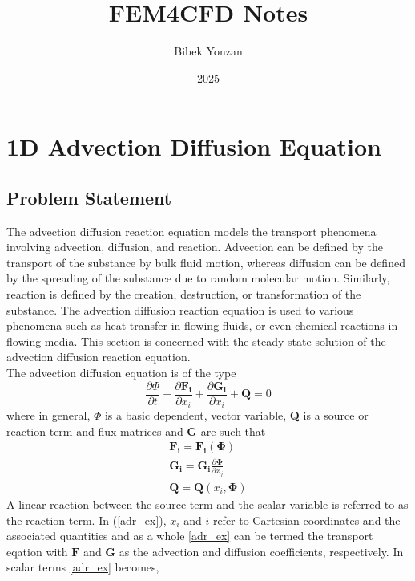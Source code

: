\documentclass[12pt, oneside]{article}
\title{\textbf{FEM4CFD Notes}}
\author{Bibek Yonzan}
\date{2025}
\begin{document}
\maketitle
\tableofcontents

\vspace{.25in}

\section{1D Advection Diffusion Equation}

\subsection{Problem Statement}

The advection diffusion reaction equation models the transport phenomena involving advection, diffusion, and reaction. Advection can be defined by the transport of the substance by bulk fluid motion, whereas diffusion can be defined by the spreading of the substance due to random molecular motion. Similarly, reaction is defined by the creation, destruction, or transformation of the substance. The advection diffusion reaction equation is used to various phenomena such as heat transfer in flowing fluids, or even chemical reactions in flowing media. This section is concerned with the steady state solution of the advection diffusion reaction equation. \\
The advection diffusion equation is of the type
   \begin{equation}
       \frac{\partial\Phi}{\partial t} + \frac{\partial{\boldsymbol{F_i}}}{\partial{x_i}} + \frac{\partial\boldsymbol{G_i}}{\partial{x_i}} + \boldsymbol{Q} = 0
   \end{equation}
where in general, $\Phi$ is a basic dependent, vector variable, \textbf{Q} is a source or reaction term and flux matrices  and \textbf{G} are such that
    \begin{equation}\label{adr_ex}
          \begin{aligned}
	    \boldsymbol{F_i} = \boldsymbol{F_i}(\boldsymbol{\Phi})\\
	    \boldsymbol{G_i} = \boldsymbol{G_i}\frac{\partial{\boldsymbol{\Phi}}}{\partial{x_j}}\\
	    \boldsymbol{Q} = \boldsymbol{Q}(x_i, \boldsymbol{\Phi})
          \end{aligned}
    \end{equation}
    A linear reaction between the source term and the scalar variable is referred to as the reaction term. In (\ref{adr_ex}), $x_i$ and $i$ refer to Cartesian coordinates and the associated quantities and as a whole \ref{adr_ex} can be termed the transport eqation with $\boldsymbol{F}$ and $\boldsymbol{G}$ as the advection and diffusion coefficients, respectively. In scalar terms \ref{adr_ex} becomes,
\end{document}

